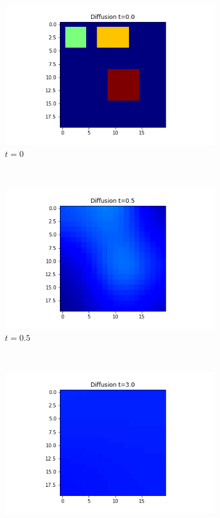 \documentclass[10pt,a4paper]{article}
\begin{document}
\begin{enumerate}[i)]
\begin{enumerate}[a)]
    		\begin{figure}[!h]
    			\centering
    			\begin{subfigure}[b]{0.25\textwidth}
    				\includegraphics[width=\textwidth]{images/grid-t0-x02.png}
    				\caption{$t=0$}
    				\label{gridt0x02}
    			\end{subfigure}~
    			\begin{subfigure}[b]{0.25\textwidth}
    				\includegraphics[width= \textwidth]{images/grid-t05-x02.png}
    				\caption{$t=0.5$}
    				\label{gridt05x02}
    			\end{subfigure}~
    			\begin{subfigure}[b]{0.25\textwidth}
    				\includegraphics[width= \textwidth]{images/grid-t3-x02.png}

\end{subfigure}
\end{figure}
\end{enumerate}
\end{enumerate}
\end{document}
